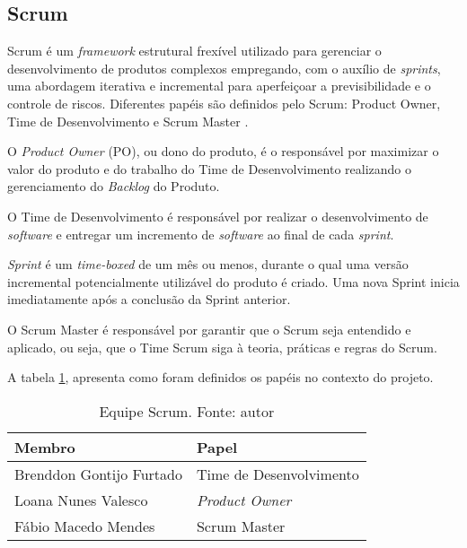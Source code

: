     \subsection{Scrum}
    Scrum é um \textit{framework} estrutural frexível utilizado
    para gerenciar o desenvolvimento de produtos complexos empregando, com o auxílio de \textit{sprints}, uma abordagem iterativa
    e incremental para aperfeiçoar a previsibilidade e o controle de riscos. Diferentes papéis são definidos pelo Scrum: Product Owner, Time de Desenvolvimento e Scrum Master \cite{scrum_guide}.

    O \textit{Product Owner} (PO), ou dono do produto, é o responsável por maximizar o valor
    do produto e do trabalho do Time de Desenvolvimento realizando o gerenciamento
    do \textit{Backlog} do Produto.

    O Time de Desenvolvimento é responsável por realizar o desenvolvimento de \textit{software} e entregar um incremento de \textit{software} ao final de cada \textit{sprint}.

    \textit{Sprint} é um \textit{time-boxed} de um mês ou menos, durante o qual
    uma versão incremental potencialmente utilizável do produto é criado.
    Uma nova Sprint inicia imediatamente após a conclusão da Sprint anterior.

    O Scrum Master é responsável por garantir que o Scrum seja entendido e aplicado, ou seja, que o Time Scrum siga à teoria, práticas e regras do Scrum.

    A tabela \ref{equipe_scrum}, apresenta como foram definidos os papéis no contexto do projeto.

    \begin{table}[!htbp]
        \centering
        \caption{Equipe Scrum. Fonte: autor}
        \label{equipe_scrum}
        \begin{tabular}{|p{5cm}|p{4cm}|}
        \hline
        \textbf{Membro}                                                           & \textbf{Papel}        \\\hline
        Brenddon Gontijo Furtado                                                  & Time de Desenvolvimento \\\hline
        Loana Nunes Valesco                                                       & \textit{Product Owner}    \\\hline
        Fábio Macedo Mendes                                                       & Scrum Master    \\\hline
        \end{tabular}
    \end{table}

